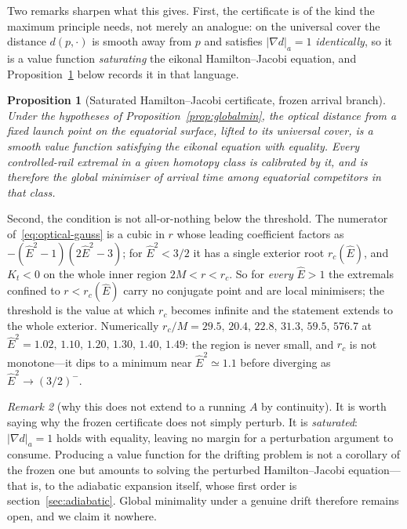 \documentclass[12pt]{iopart}
\theoremstyle{plain}
\newtheorem{proposition}{Proposition}
\theoremstyle{definition}
\theoremstyle{remark}
\newtheorem{remark}[proposition]{Remark}
\newcommand{\Ehat}{\hat E}
\begin{document}
Two remarks sharpen what this gives. First, the certificate is of the kind the
maximum principle needs, not merely an analogue: on the universal cover the
distance $d(p,\cdot)$ is smooth away from $p$ and satisfies
$|\nabla d|_a=1$ \emph{identically}, so it is a value function
\emph{saturating} the eikonal Hamilton--Jacobi equation, and
Proposition~\ref{prop:hjb-frozen} below records it in that language.

\begin{proposition}[Saturated Hamilton--Jacobi certificate, frozen arrival branch]
\label{prop:hjb-frozen}
Under the hypotheses of Proposition~\ref{prop:globalmin}, the optical distance
from a fixed launch point on the equatorial surface, lifted to its universal
cover, is a smooth value function satisfying the eikonal equation with equality.
Every controlled-rail extremal in a given homotopy class is calibrated by it, and
is therefore the global minimiser of arrival time among equatorial competitors in
that class.
\end{proposition}

Second, the condition is not all-or-nothing below the threshold. The numerator
of~\eqref{eq:optical-gauss} is a cubic in $r$ whose leading coefficient factors
as $-(\Ehat^2-1)(2\Ehat^2-3)$; for $\Ehat^2<3/2$ it has a single exterior root
$r_c(\Ehat)$, and $K_t<0$ on the whole inner region $2M<r<r_c$. So for
\emph{every} $\Ehat>1$ the extremals confined to $r<r_c(\Ehat)$ carry no
conjugate point and are local minimisers; the threshold is the value at which
$r_c$ becomes infinite and the statement extends to the whole exterior.
Numerically $r_c/M=29.5,\,20.4,\,22.8,\,31.3,\,59.5,\,576.7$ at
$\Ehat^2=1.02,\,1.10,\,1.20,\,1.30,\,1.40,\,1.49$: the region is never small, and
$r_c$ is not monotone---it dips to a minimum near $\Ehat^2\simeq1.1$ before
diverging as $\Ehat^2\to(3/2)^-$.

\begin{remark}[why this does not extend to a running $A$ by continuity]
\label{rmk:nodrift}
It is worth saying why the frozen certificate does not simply perturb. It is
\emph{saturated}: $|\nabla d|_a=1$ holds with equality, leaving no margin for a
perturbation argument to consume. Producing a value function for the drifting
problem is not a corollary of the frozen one but amounts to solving the
perturbed Hamilton--Jacobi equation---that is, to the adiabatic expansion itself,
whose first order is section~\ref{sec:adiabatic}. Global minimality under a
genuine drift therefore remains open, and we claim it nowhere.
\end{remark}
\end{document}
